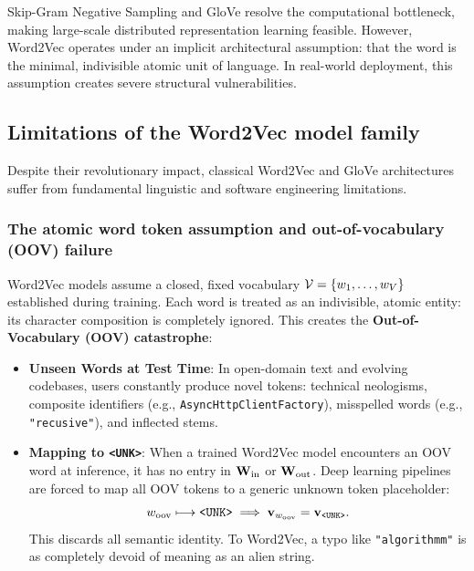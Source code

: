 \documentclass[../../../main.tex]{subfiles}
\begin{document}
Skip-Gram Negative Sampling and GloVe resolve the computational bottleneck, making large-scale distributed representation learning feasible. However, Word2Vec operates under an implicit architectural assumption: that the word is the minimal, indivisible atomic unit of language. In real-world deployment, this assumption creates severe structural vulnerabilities.

\clearpage


\subsection{Limitations of the Word2Vec model family}
\label{sec:word2vec_limitations}

Despite their revolutionary impact, classical Word2Vec and GloVe architectures suffer from fundamental linguistic and software engineering limitations.

\subsubsection{The atomic word token assumption and out-of-vocabulary (OOV) failure}
\label{subsec:oov_barrier}

Word2Vec models assume a closed, fixed vocabulary $\mathcal{V} = \{w_1, \dots, w_V\}$ established during training. Each word is treated as an indivisible, atomic entity: its character composition is completely ignored. This creates the \textbf{Out-of-Vocabulary (OOV) catastrophe}:
\begin{itemize}
    \item \textbf{Unseen Words at Test Time}: In open-domain text and evolving codebases, users constantly produce novel tokens: technical neologisms, composite identifiers (e.g., \texttt{AsyncHttpClientFactory}), misspelled words (e.g., \texttt{"recusive"}), and inflected stems.
    \item \textbf{Mapping to \texttt{<UNK>}}: When a trained Word2Vec model encounters an OOV word at inference, it has no entry in $\mathbf{W}_{\text{in}}$ or $\mathbf{W}_{\text{out}}$. Deep learning pipelines are forced to map all OOV tokens to a generic unknown token placeholder:
    \begin{equation}
    \label{eq:unk_collapse}
    w_{\text{oov}} \longmapsto \text{\texttt{<UNK>}} \implies \mathbf{v}_{w_{\text{oov}}} = \mathbf{v}_{\text{\texttt{<UNK>}}}.
    \end{equation}
    This discards all semantic identity. To Word2Vec, a typo like \texttt{"algorithmm"} is as completely devoid of meaning as an alien string.
\end{itemize}
\end{document}
